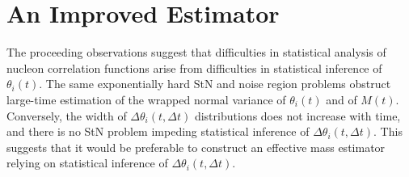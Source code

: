 \section{An Improved Estimator}\label{sec:estimator}

The proceeding observations suggest that difficulties in statistical analysis of nucleon correlation functions 
arise from difficulties in statistical inference of $\theta_i(t)$. The same exponentially hard StN and noise region 
problems obstruct large-time estimation of the wrapped normal variance of $\theta_i(t)$ and of $M(t)$. 
Conversely, the width of $\Delta \theta_i(t,\Delta t)$ distributions does not increase with time, and there is 
no StN problem impeding statistical inference of $\Delta \theta_i(t,\Delta t)$. 
This suggests that it would be preferable to construct an effective mass estimator relying on statistical 
inference of $\Delta\theta_i(t,\Delta t)$.

